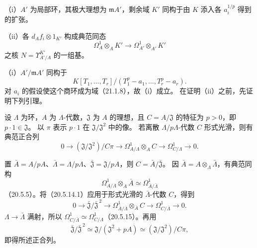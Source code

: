 \noindent（i）$A'$ 为局部环，其极大理想为 $\mathfrak mA'$，剩余域 $K'$ 同构于由 $K$ 添入各 $a_i^{1/p}$ 得到的扩张。

\noindent（ii）各 $d_Af_i\otimes1_{K'}$ 构成典范同态
\[
 \Omega^1_A\otimes_AK'\longrightarrow\Omega^1_{A'}\otimes_{A'}K'
\]
之核 $N=\Upsilon^{K'}_{A'/A}$ 的一组基。

\eproof
（i）$A'/\mathfrak mA'$ 同构于
\[
 K[T_1,\ldots,T_r]/(T_1^p-a_1,\ldots,T_r^p-a_r).
\]
对 $a_i$ 的假设使这个商环成为域（21.1.8），故（i）成立。
在证明（ii）之前，先证明下列引理。

设 $\Lambda$ 为环，$A$ 为 $\Lambda$-代数，$\mathfrak J$ 为 $A$ 的理想，且 $C=A/\mathfrak J$ 的特征为 $p>0$，即 $p\cdot1\in\mathfrak J$。
以 $\pi$ 表示 $p\cdot1$ 在 $\mathfrak J/\mathfrak J^2$ 中的像。
若离散 $\Lambda/p\Lambda$-代数 $C$ 形式光滑，则有典范正合列
\begin{equation}
 0\longrightarrow(\mathfrak J/\mathfrak J^2)/C\pi
 \longrightarrow\Omega^1_{A/\Lambda}\otimes_AC
 \longrightarrow\Omega^1_{C/\Lambda}\longrightarrow0.
 \tag{22.4.4.3}
\end{equation}

\eproof
置 $\bar A=A/pA$、$\bar\Lambda=\Lambda/p\Lambda$、$\bar{\mathfrak J}=\mathfrak J/pA$，则 $C=\bar A/\bar{\mathfrak J}$。
因 $\bar A=A\otimes_\Lambda\bar\Lambda$，有典范同构
\[
 \Omega^1_{A/\Lambda}\otimes_A\bar A\simeq\Omega^1_{\bar A/\bar\Lambda}
\]
（20.5.5）。将（20.5.14.1）应用于形式光滑的 $\bar\Lambda$-代数 $C$，得到
\[
 0\longrightarrow\bar{\mathfrak J}/\bar{\mathfrak J}^{\,2}
 \longrightarrow\Omega^1_{\bar A/\bar\Lambda}\otimes_{\bar A}C
 \longrightarrow\Omega^1_{C/\bar\Lambda}\longrightarrow0.
\]
$\Lambda\to\bar\Lambda$ 满射，所以 $\Omega^1_{C/\bar\Lambda}\simeq\Omega^1_{C/\Lambda}$（20.5.15）。再用
\[
 \bar{\mathfrak J}/\bar{\mathfrak J}^{\,2}
 \simeq\mathfrak J/(\mathfrak J^2+pA)
 \simeq(\mathfrak J/\mathfrak J^2)/C\pi,
\]
即得所述正合列。
\finishproof

